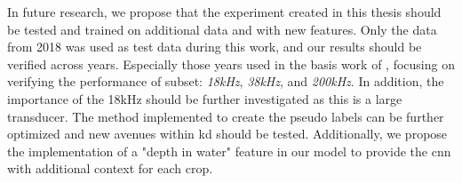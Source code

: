     
     In future research, we propose that the experiment created in this thesis should be tested and trained on additional data and with new features. Only the data from 2018 was used as test data during this work, and our results should be verified across years. Especially those years used in the basis work of \citeauthor{brautaset2020acoustic}, focusing on verifying the performance of subset: \textit{18kHz}, \textit{38kHz}, and \textit{200kHz}. In addition, the importance of the 18kHz should be further investigated as this is a large transducer. The method implemented to create the pseudo labels can be further optimized and new avenues within \gls{kd} should be tested. Additionally, we propose the implementation of a "depth in water" feature in our model to provide the \gls{cnn} with additional context for each crop.
    
    
    
 